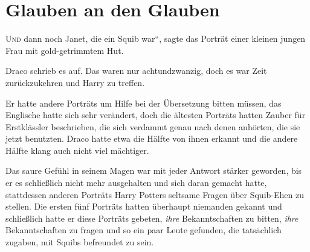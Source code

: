 \chapter{Glauben an den Glauben}


\lettrine[ante=„]{U}{nd} dann noch Janet, die ein Squib war“, sagte das Porträt einer kleinen jungen Frau mit gold-getrimmtem Hut.

Draco schrieb es auf. Das waren nur achtundzwanzig, doch es war Zeit zurückzukehren und Harry zu treffen.

Er hatte andere Porträts um Hilfe bei der Übersetzung bitten müssen, das Englische hatte sich sehr verändert, doch die ältesten Porträts hatten Zauber für Erstklässler beschrieben, die sich verdammt genau nach denen anhörten, die sie jetzt benutzten. Draco hatte etwa die Hälfte von ihnen erkannt und die andere Hälfte klang auch nicht viel mächtiger.

Das saure Gefühl in seinem Magen war mit jeder Antwort stärker geworden, bis er es schließlich nicht mehr ausgehalten und sich daran gemacht hatte, stattdessen anderen Porträts Harry Potters seltsame Fragen über Squib-Ehen zu stellen. Die ersten fünf Porträts hatten überhaupt niemanden gekannt und schließlich hatte er diese Porträts gebeten, \emph{ihre} Bekanntschaften zu bitten, \emph{ihre} Bekanntschaften zu fragen und so ein paar Leute gefunden, die tatsächlich zugaben, mit Squibs befreundet zu sein.

